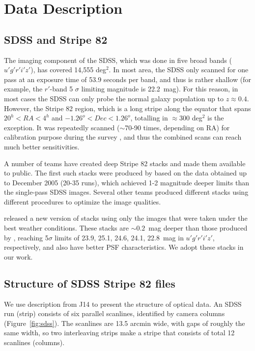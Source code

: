 \documentclass[apj,iop]{emulateapj}
\begin{document}
\section{Data Description}


\subsection{SDSS and Stripe 82}

The imaging component of the SDSS, which was done in five broad bands ($u' g' r' i' z'$), has covered 14,555 deg$^2$. In most area, the SDSS only scanned for one pass at an exposure time of 53.9 seconds per band, and thus is rather shallow (for example, the $r'$-band 5 $\sigma$ limiting magnitude is 22.2~mag). For this reason, in most cases the SDSS can only probe the normal galaxy population up to $z\approx 0.4$. However, the Stripe 82 region, which is a long stripe along the equator that spans $20^h < RA < 4^h$ and $-1.26^o < Dec < 1.26^o$, totalling in $\approx$300 deg$^2$ is the exception. It was repeatedly scanned ($\sim$70-90 times, depending on RA) for calibration purpose during the survey \citep{Adelman-McCarthy2007}, and thus the combined scans can reach much better sensitivities.

A number of teams have created deep Stripe 82 stacks and made them available to public. The first such stacks were produced by \citet[][]{Annis2014} based on the data obtained up to December 2005 (20-35 runs), which achieved 1-2 magnitude deeper limits than the single-pass SDSS images. Several other teams \citep[e.g.,][]{2009AJ....138..305J, 2014MNRAS.440.1296H} produced different stacks using different procedures to optimize the image qualities.

\citet[][hereafter J14]{Jiang2014} released a new version of stacks using only the images that were taken under the best weather conditions. These stacks are $\sim0.2$~mag deeper than those produced by \citet[][]{Annis2014}, reaching 5$\sigma$ limits of 23.9, 25.1, 24.6, 24.1, 22.8~mag in $u' g' r' i' z'$, respectively, and also have better PSF characteristics. We adopt these stacks in our work.

\subsection{Structure of SDSS Stripe 82 files}

We use description from J14 to present the structure of optical data. An SDSS run (strip) consists of six parallel scanlines, identified by camera columns (Figure~\ref{fig:sdss}). The scanlines are 13.5 arcmin wide, with gaps of roughly the same width, so two interleaving strips make a stripe that consists of total 12 scanlines (columns). 
\end{document}
